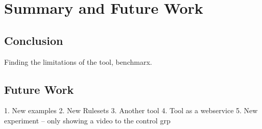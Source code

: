 \section{Summary and Future Work}\label{sec:timeplan}
\subsection{Conclusion}\label{subsec:conclusion}
Finding the limitations of the tool, benchmarx.
\subsection{Future Work}\label{subsec:futurework}
1. New examples
2. New Rulesets
3. Another tool
4. Tool as a webservice
5. New experiment -- only showing a video to the control grp




